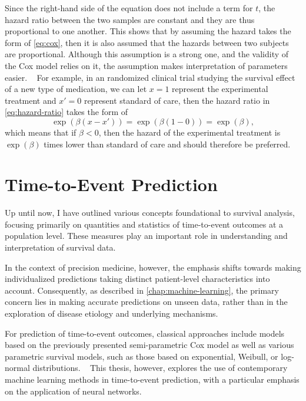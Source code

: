 Since the right-hand side of the equation does not include a term for \(t\),
the hazard ratio between the two samples are constant and 
they are thus proportional to one another.
This shows that by assuming the hazard takes the form of \cref{eq:cox},
then it is also assumed that the hazards between two subjects are proportional.
Although this assumption is a strong one, 
and the validity of the Cox model relies on it, 
the assumption makes interpretation of parameters easier.
~\autocite{tutzModeling2016}
For example, 
in an randomized clinical trial
studying the survival effect of a new type of medication, 
we can let \(x = 1\) represent the experimental treatment  
and \(x' = 0\) represent standard of care, 
then the hazard ratio in \cref{eq:hazard-ratio} takes the form of
%
\begin{equation}
      \exp \left(\beta (x - x')\right)
    = \exp \left(\beta (1 - 0)\right)
    = \exp (\beta ),
\end{equation}
%
which means that if \(\beta < 0\), 
then the hazard of the experimental treatment is 
\(\exp({\beta})\) times lower than standard of care
and should therefore be preferred.%


\section{Time-to-Event Prediction}

Up until now, 
I have outlined various concepts foundational to survival analysis,
focusing primarily on quantities and statistics of time-to-event outcomes
at a population level.
These measures play an important role in understanding 
and interpretation of survival data.

In the context of precision medicine, however,
the emphasis shifts towards making individualized predictions
taking distinct patient-level characteristics into account.
Consequently, as described in \cref{chap:machine-learning}, 
the primary concern lies in 
making accurate predictions on unseen data,
rather than in the exploration of disease etiology and underlying mechanisms.

For prediction of time-to-event outcomes, classical approaches 
include models based on the previously presented semi-parametric Cox model 
as well as various parametric survival models, 
such as those based on exponential, Weibull, or log-normal distributions.
~\autocite{kleinSurvival2003}
This thesis, however, 
explores the use of contemporary machine learning methods 
in time-to-event prediction,
with a particular emphasis on the application of neural networks.

